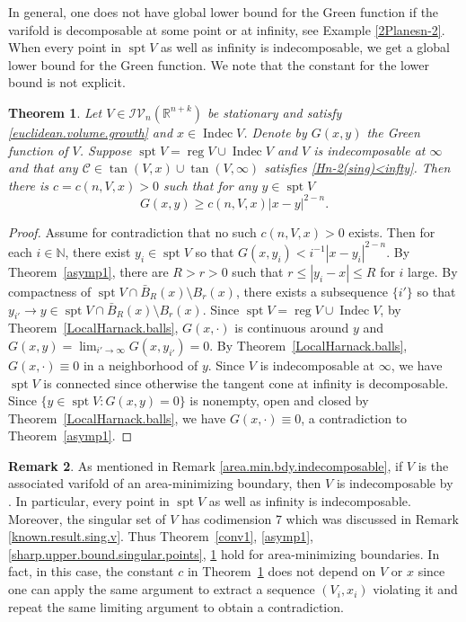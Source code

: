\documentclass[11pt]{amsart}
\newtheorem{theorem}{Theorem}[section]
\theoremstyle{definition}
\newtheorem{remark}[theorem]{Remark}
\newcommand{\R}{\mathbb{R}}
\newcommand{\N}{\mathbb{N}}
\newcommand{\C}{\mathcal{C}}
\newcommand{\IV}{\mathcal{IV}}
\DeclareMathOperator{\spt}{spt}
\DeclareMathOperator{\reg}{reg}
\DeclareMathOperator{\indec}{Indec}
\begin{document}
In general, one does not have global lower bound for the Green function if the varifold is decomposable at some point or at infinity, see Example \ref{2Planesn-2}. When every point in $\spt V$ as well as infinity is indecomposable, we get a global lower bound for the Green function. We note that the constant for the lower bound is not explicit.

\begin{theorem}\label{global.lower.bound}
    Let $V\in \IV_n(\R^{n+k})$ be stationary and satisfy \eqref{euclidean.volume.growth} and $x\in \indec V$. Denote by $G(x,y)$ the Green function of $V$. Suppose $\spt V=\reg V\cup\indec V$ and $V$ is indecomposable at $\infty$ and that any $\C\in \tan(V,x)\cup  \tan(V,\infty)$ satisfies \eqref{Hn-2(sing)<infty}. Then there is $c=c(n,V,x)>0$ such that for any $y\in \spt V$
	\[ G(x,y)\ge c(n,V,x)|x-y|^{2-n}.\]
\end{theorem}
\begin{proof}
	Assume for contradiction that no such $c(n,V,x)>0$ exists. Then for each $i\in \N$, there exist $y_i\in \spt V$ so that $G(x,y_i)<i^{-1}|x-y_i|^{2-n}$. By Theorem~\ref{asymp1}, there are $R>r>0$ such that $r\le |y_i-x|\le R$ for $i$ large. By compactness of $\spt V\cap \bar B_R(x)\setminus B_r(x)$, there exists a subsequence $\{i'\}$ so that $ y _{i'}\to y\in \spt V\cap \bar B_R(x)\setminus B_r(x)$. Since $\spt V=\reg V\cup\indec V$, by Theorem~\ref{LocalHarnack.balls}, $G(x,\cdot)$ is continuous around $y$ and $G(x,y)=\lim_{i'\to\infty} G(x,y_{i'})=0$. By Theorem~\ref{LocalHarnack.balls}, $G(x,\cdot)\equiv 0$ in a neighborhood of $y$. Since $V$ is indecomposable at $\infty$, we have $\spt V$ is connected since otherwise the tangent cone at infinity is decomposable. Since  $\{y\in\spt V:G(x,y)= 0\}$ is nonempty, open and closed by  Theorem~\ref{LocalHarnack.balls}, we have $G(x,\cdot)\equiv 0$, a contradiction to Theorem~\ref{asymp1}.
\end{proof}
\begin{remark}\label{area.min.c=c(n)}
    As mentioned in Remark \ref{area.min.bdy.indecomposable}, if $V$ is the associated varifold of an area-minimizing boundary, then $V$ is indecomposable by \cite[Theorem 1]{bombieri1972harnack}. In particular,  every point in $\spt V$ as well as infinity is indecomposable. Moreover, the singular set of $V$ has codimension 7 which was discussed in Remark \ref{known.result.sing.v}.  Thus Theorem~\ref{conv1}, \ref{asymp1}, \ref{sharp.upper.bound.singular.points}, \ref{global.lower.bound} hold for area-minimizing boundaries. In fact, in this case, the constant $c$ in Theorem~\ref{global.lower.bound} does not depend on $V$ or $x$ since one can apply the same argument to extract a sequence $(V_i,x_i)$ violating it and repeat the same limiting argument to obtain a contradiction.
\end{remark}
\end{document}
